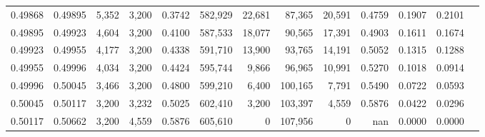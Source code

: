 \begin{tabular}{rrrrrrrrrrrrr}
0.49868 & 0.49895 &  5,352 & 3,200 &                                     0.3742 & 582,929 &  22,681 &  87,365 &  20,591 & 0.4759 & 0.1907 & 0.2101 \\
0.49895 & 0.49923 &  4,604 & 3,200 &                                     0.4100 & 587,533 &  18,077 &  90,565 &  17,391 & 0.4903 & 0.1611 & 0.1674 \\
0.49923 & 0.49955 &  4,177 & 3,200 &                                     0.4338 & 591,710 &  13,900 &  93,765 &  14,191 & 0.5052 & 0.1315 & 0.1288 \\
0.49955 & 0.49996 &  4,034 & 3,200 &                                     0.4424 & 595,744 &   9,866 &  96,965 &  10,991 & 0.5270 & 0.1018 & 0.0914 \\
0.49996 & 0.50045 &  3,466 & 3,200 &                                     0.4800 & 599,210 &   6,400 & 100,165 &   7,791 & 0.5490 & 0.0722 & 0.0593 \\
0.50045 & 0.50117 &  3,200 & 3,232 &                                     0.5025 & 602,410 &   3,200 & 103,397 &   4,559 & 0.5876 & 0.0422 & 0.0296 \\
0.50117 & 0.50662 &  3,200 & 4,559 &                                     0.5876 & 605,610 &       0 & 107,956 &       0 &    nan & 0.0000 & 0.0000 \\
\bottomrule
\end{tabular}
